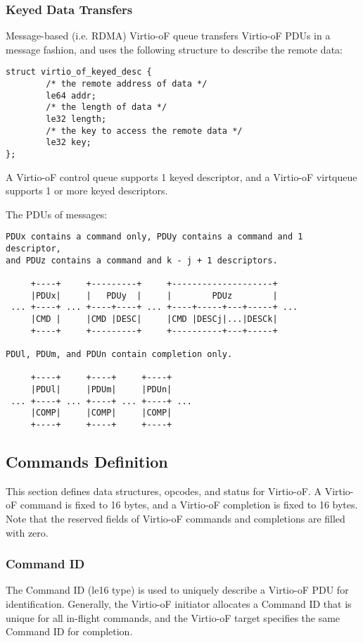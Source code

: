 \subsubsection{Keyed Data Transfers}\label{sec:Virtio Transport Options / Virtio Over Fabrics / Protocol Data Unit/ Keyed Data Transfers}
Message-based (i.e. RDMA) Virtio-oF queue transfers Virtio-oF PDUs in a message fashion, and uses the following structure to describe the remote data:

\begin{lstlisting}
struct virtio_of_keyed_desc {
        /* the remote address of data */
        le64 addr;
        /* the length of data */
        le32 length;
        /* the key to access the remote data */
        le32 key;
};
\end{lstlisting}

A Virtio-oF control queue supports 1 keyed descriptor, and a Virtio-oF virtqueue supports 1 or more keyed descriptors.

The PDUs of messages:
\begin{lstlisting}
PDUx contains a command only, PDUy contains a command and 1 descriptor,
and PDUz contains a command and k - j + 1 descriptors.

     +----+     +---------+     +--------------------+
     |PDUx|     |   PDUy  |     |        PDUz        |
 ... +----+ ... +----+----+ ... +----+-----+---+-----+ ...
     |CMD |     |CMD |DESC|     |CMD |DESCj|...|DESCk|
     +----+     +---------+     +----------+---+-----+

PDUl, PDUm, and PDUn contain completion only.

     +----+     +----+     +----+
     |PDUl|     |PDUm|     |PDUn|
 ... +----+ ... +----+ ... +----+ ...
     |COMP|     |COMP|     |COMP|
     +----+     +----+     +----+
\end{lstlisting}


\subsection{Commands Definition}\label{sec:Virtio Transport Options / Virtio Over Fabrics / Commands Definition}
This section defines data structures, opcodes, and status for Virtio-oF.
A Virtio-oF command is fixed to 16 bytes, and a Virtio-oF completion is fixed to 16 bytes.
Note that the reserved fields of Virtio-oF commands and completions are filled with zero.

\subsubsection{Command ID}\label{sec:Virtio Transport Options / Virtio Over Fabrics / Commands Definition / Command ID}
The Command ID (le16 type) is used to uniquely describe a Virtio-oF PDU for identification.
Generally, the Virtio-oF initiator allocates a Command ID that is unique for all in-flight commands,
and the Virtio-oF target specifies the same Command ID for completion.

